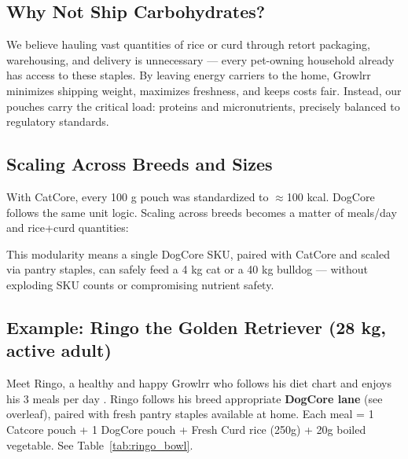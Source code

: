 \subsection*{Why Not Ship Carbohydrates?}

We believe hauling vast quantities of rice or curd through retort packaging, warehousing, and delivery is unnecessary --- every pet-owning household already has access to these staples. By leaving energy carriers to the home, Growlrr minimizes shipping weight, maximizes freshness, and keeps costs fair. Instead, our pouches carry the critical load: proteins and micronutrients, precisely balanced to regulatory standards.

\subsection*{Scaling Across Breeds and Sizes}

With CatCore, every 100 g pouch was standardized to $\approx$100 kcal. DogCore follows the same unit logic. Scaling across breeds becomes a matter of meals/day and rice+curd quantities:


This modularity means a single DogCore SKU, paired with CatCore and scaled via pantry staples, can safely feed a 4 kg cat or a 40 kg bulldog --- without exploding SKU counts or compromising nutrient safety.


\vspace{6mm}


\subsection*{Example: Ringo the Golden Retriever (28 kg, active adult)}

Meet Ringo, a healthy and happy Growlrr who follows his diet chart and enjoys his 3 meals per day  . Ringo follows his breed appropriate \textbf{DogCore lane} (see overleaf), paired with fresh pantry staples available at home. Each meal = 1 Catcore pouch + 1 \colorbox{goldenorange}{\phantom{X}} DogCore pouch + Fresh Curd rice (250g) + 20g boiled vegetable. See Table~\ref{tab:ringo_bowl}.


